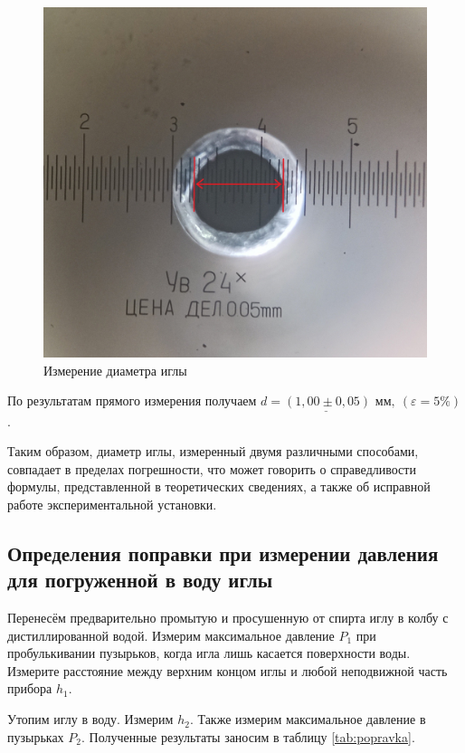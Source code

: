 \documentclass[a4paper,12pt]{article} %
\begin{document}
\begin{figure}[H]
	\begin{center}
		\includegraphics[width=16cm]{igla.jpg}
		\caption{Измерение диаметра иглы}\label{img:igla}
	\end{center}
\end{figure}

По результатам прямого измерения получаем $ \underline{d = (1,00 \pm 0,05) \text{ мм}}, \: (\varepsilon = 5\%) $.

\medskip

Таким образом, диаметр иглы, измеренный двумя различными способами, совпадает в пределах погрешности, что может говорить о справедливости формулы, представленной в теоретических сведениях, а также об исправной работе экспериментальной установки.

\subsection{Определения поправки при измерении давления для погруженной в воду иглы}

Перенесём предварительно промытую и просушенную от спирта иглу в колбу с дистиллированной водой. Измерим максимальное давление $ P_1 $ при пробулькивании пузырьков, когда игла лишь касается поверхности воды. Измерите расстояние между верхним концом иглы и любой неподвижной часть прибора $ h_1 $.

Утопим иглу в воду. Измерим $ h_2 $. Также измерим максимальное давление в пузырьках $ P_2 $. Полученные результаты заносим в таблицу \ref{tab:popravka}.
\end{document}
